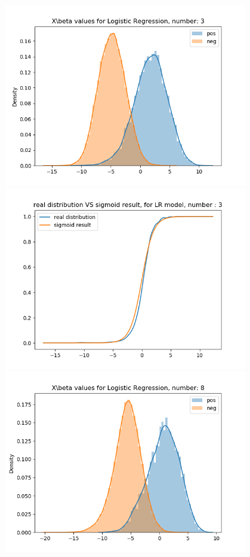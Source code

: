 \documentclass{article}
\begin{document}
\begin{figure}[H]
\begin{minipage}{0.19\textwidth}
    \end{minipage}
    \begin{minipage}{0.19\textwidth}
        \centering
        \includegraphics[width=0.95\textwidth]{fig/lr/3.png}
        \includegraphics[width=0.95\textwidth]{fig/lr/3-2.png}
        \includegraphics[width=0.95\textwidth]{fig/lr/8.png}

\end{minipage}
\end{figure}
\end{document}
